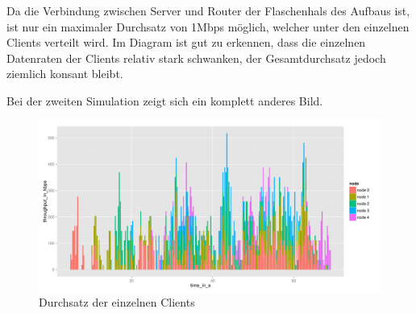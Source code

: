 \documentclass[a4paper, 12pt]{scrartcl}
\begin{document}
Da die Verbindung zwischen Server und Router der Flaschenhals des Aufbaus ist, ist nur ein maximaler Durchsatz von 1Mbps möglich, welcher unter den einzelnen Clients verteilt wird. Im Diagram ist gut zu erkennen, dass die einzelnen Datenraten der Clients relativ stark schwanken, der Gesamtdurchsatz jedoch ziemlich konsant bleibt.



Bei der zweiten Simulation zeigt sich ein komplett anderes Bild. 

\begin{figure}[htbp]
	\centering
    \includegraphics[width=15cm]{ReNe_SoSe_2013_PA2b_943147_stackedbar.pdf}
  \caption{Durchsatz der einzelnen Clients}
  \label{Labelname}
\end{figure}
\end{document}

